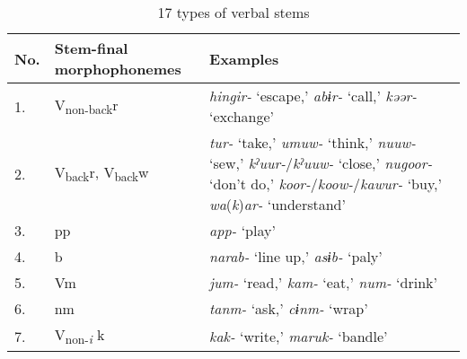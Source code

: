 \begin{table}
\caption{\label{tab:key:57}17 types of verbal stems}
\begin{tabular}{lll}
\lsptoprule
No. &   Stem-final morphophonemes  & Examples\\
\midrule
1. & V\textsubscript{non-back}r                        &  \textit{hingir-} ‘escape,’ \textit{abɨr-} ‘call,’ \textit{kəər-} ‘exchange’                                                                                                                                                                         \\
2. & V\textsubscript{back}r, V\textsubscript{back}w    & \textit{tur-} ‘take,’ \textit{umuw-} ‘think,’ \textit{nuuw-} ‘sew,’ \textit{kˀuur-}/\textit{kˀuuw-} ‘close,’ \textit{nugoor-} ‘don’t do,’ \textit{koor-}/\textit{koow-}/\textit{kawur-} ‘buy,’ \textit{wa}(\textit{k})\textit{ar-} ‘understand’      \\
3. & pp                                                & \textit{app-} ‘play’                                                                                                                                                                                                                                 \\
4. & b                                                 &\textit{narab-} ‘line up,’ \textit{asɨb-} ‘paly’                                                                                                                                                                                                      \\
5. & Vm                                                & \textit{jum-} ‘read,’ \textit{kam-} ‘eat,’ \textit{num-} ‘drink’                                                                                                                                                                                     \\
6. & nm                                                &  \textit{tanm-} ‘ask,’ \textit{cɨnm-} ‘wrap’                                                                                                                                                                                                         \\
7. & V\textsubscript{non-}\textit{\textsubscript{i}} k & \textit{kak-} ‘write,’ \textit{maruk-} ‘bandle’                                                                                                                                                                                                      \\

\end{tabular}
\end{table}
